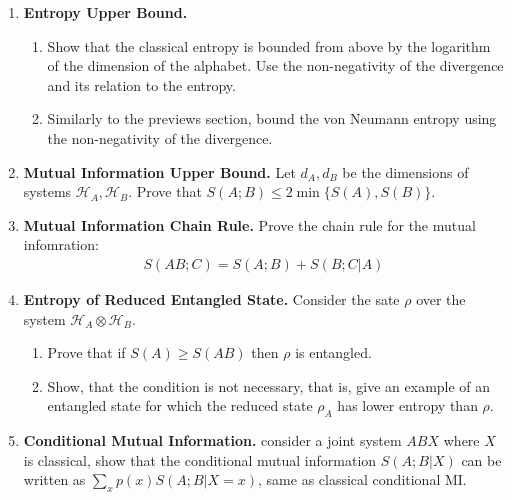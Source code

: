 \documentclass[12pt,a4paper]{article}
\begin{document}
\begin{enumerate}



  \item \textbf{Entropy Upper Bound.}

   \begin{enumerate}
     \item Show that the classical entropy is bounded from above by the logarithm of the dimension of the alphabet. Use the non-negativity of the divergence and its relation to the entropy.


    \item Similarly to the previews section, bound the von Neumann entropy using the non-negativity of the divergence.


  \end{enumerate}

  \item \textbf{Mutual Information Upper Bound.} 
    Let $d_{A}, d_{B}$ be the dimensions of systems $\mathcal{H}_{A}, \mathcal{H}_{B}$. Prove that $S(A;B) \le 2\min \{S(A), S(B) \}$.




  \item \textbf{Mutual Information Chain Rule.} Prove the chain rule for the mutual infomration:
    \begin{equation*}
      \begin{split}
        S(AB;C) = S(A;B) + S(B;C|A) 
      \end{split}
    \end{equation*}


  \item \textbf{Entropy of Reduced Entangled State.} Consider the sate $\rho$ over the system $\mathcal{H}_{A} \otimes \mathcal{H}_{B}$.
    \begin{enumerate}
      \item Prove that if $S(A) \ge S(AB)$ then $\rho$ is entangled.   


      \item  Show, that the condition is not necessary, that is, give an example of an entangled state for which the reduced state $\rho_A$ has lower entropy than $\rho$. 


    \end{enumerate}


  \item \textbf{Conditional Mutual Information.} consider a joint system $ABX$ where $X$ is classical, show that the conditional mutual information $S(A;B|X)$ can be written as $\sum_x {p(x) S(A;B|X=x)}$, same as classical conditional MI.


\end{enumerate}
\end{document}
